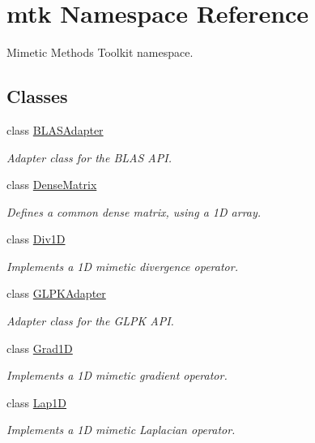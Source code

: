 \hypertarget{namespacemtk}{\section{mtk Namespace Reference}
\label{namespacemtk}
}


Mimetic Methods Toolkit namespace.  


\subsection*{Classes}
\begin{DoxyCompactItemize}
\item 
class \hyperlink{classmtk_1_1BLASAdapter}{B\-L\-A\-S\-Adapter}
\begin{DoxyCompactList}\small\item\em Adapter class for the B\-L\-A\-S A\-P\-I. \end{DoxyCompactList}\item 
class \hyperlink{classmtk_1_1DenseMatrix}{Dense\-Matrix}
\begin{DoxyCompactList}\small\item\em Defines a common dense matrix, using a 1\-D array. \end{DoxyCompactList}\item 
class \hyperlink{classmtk_1_1Div1D}{Div1\-D}
\begin{DoxyCompactList}\small\item\em Implements a 1\-D mimetic divergence operator. \end{DoxyCompactList}\item 
class \hyperlink{classmtk_1_1GLPKAdapter}{G\-L\-P\-K\-Adapter}
\begin{DoxyCompactList}\small\item\em Adapter class for the G\-L\-P\-K A\-P\-I. \end{DoxyCompactList}\item 
class \hyperlink{classmtk_1_1Grad1D}{Grad1\-D}
\begin{DoxyCompactList}\small\item\em Implements a 1\-D mimetic gradient operator. \end{DoxyCompactList}\item 
class \hyperlink{classmtk_1_1Lap1D}{Lap1\-D}
\begin{DoxyCompactList}\small\item\em Implements a 1\-D mimetic Laplacian operator. \end{DoxyCompactList}\item 

\end{DoxyCompactItemize}
